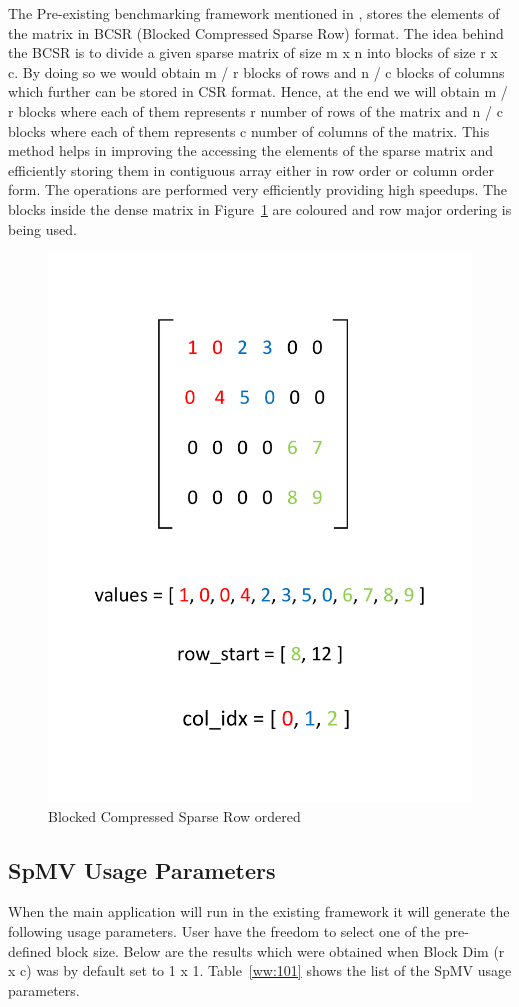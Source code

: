 The Pre-existing benchmarking framework mentioned in \cite{24}, stores the elements of the matrix in BCSR (Blocked Compressed Sparse Row) format. The idea behind the BCSR is to divide a given sparse matrix of size m x n into blocks of size r x c. By doing so we would obtain m / r blocks of rows and n / c blocks of columns which further can be stored in CSR format. Hence, at the end we will obtain m / r blocks where each of them represents r number of rows of the matrix and n / c blocks where each of them represents c number of columns of the matrix. This method helps in improving the accessing the elements of the sparse matrix and efficiently storing them in contiguous array either in row order or column order form. The operations are performed very efficiently providing high speedups. The blocks inside the dense matrix in Figure~\ref{aaaa:10000} are coloured and row major ordering is being used.  


\begin{figure}
	\centering
	\includegraphics[width=.6\textwidth]{images/bcr.pdf}
	\caption{Blocked Compressed Sparse Row ordered}
	\label{aaaa:10000}
\end{figure}

\subsection{SpMV Usage Parameters}

When the main application will run in the existing framework it will generate the following usage parameters. User have the freedom to select one of the pre-defined block size. Below are the results which were obtained when Block Dim (r x c) was by default set to 1 x 1. Table~\ref{ww:101} shows the list of the SpMV usage parameters.



